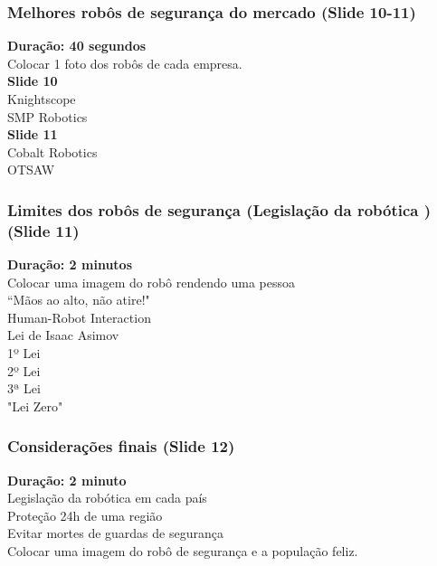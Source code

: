 \documentclass[12pt,a4paper]{article}
\begin{document}
    \subsubsection{Melhores robôs de segurança do mercado (Slide 10-11)}
    \textbf{Duração: 40 segundos} \\
    Colocar 1 foto dos robôs de cada empresa. \\
    \textbf{Slide 10} \\
    Knightscope \\
    SMP Robotics \\
    \textbf{Slide 11} \\
    Cobalt Robotics \\
    OTSAW

    \subsubsection{Limites dos robôs de segurança (Legislação da robótica
    ) (Slide 11)}
    \textbf{Duração: 2 minutos} \\
    Colocar uma imagem do robô rendendo uma pessoa \\
    “Mãos ao alto, não atire!"  \\
    Human-Robot Interaction \\
    Lei de Isaac Asimov \\
        1º Lei \\
        2º Lei \\
        3ª Lei \\
        "Lei Zero" \\

    \subsubsection{Considerações finais (Slide 12)}
    \textbf{Duração: 2 minuto} \\
    Legislação da robótica em cada país \\
    Proteção 24h de uma região \\
    Evitar mortes de guardas de segurança \\
    Colocar uma imagem do robô de segurança e a população feliz.
\end{document}
